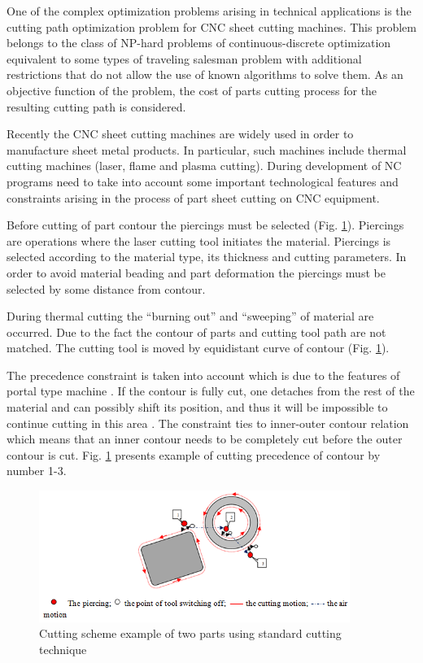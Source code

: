 \documentclass[runningheads]{llncs}
\begin{document}
One of the complex optimization problems arising in technical applications
is the cutting path optimization problem for CNC sheet cutting machines.
This problem belongs to the class of NP-hard problems
of continuous-discrete optimization
equivalent to some types of traveling salesman problem
with additional restrictions
that do not allow the use of known algorithms to solve them.
As an objective function of the problem,
the cost of parts cutting process for the resulting cutting path is considered.

Recently the CNC sheet cutting machines are widely used in order to manufacture sheet metal products.
In particular, such machines include thermal cutting machines
(laser, flame and plasma cutting).
During development of NC programs need to take into account
some important technological features and constraints
arising in the process of part sheet cutting on CNC equipment.

Before cutting of part contour the piercings must be selected (Fig. \ref{elements}).
Piercings are operations where the laser cutting tool initiates the material.
Piercings is selected according to the material type, its thickness and cutting parameters.
In order to avoid material beading and part deformation
the piercings must be selected by some distance from contour.

During thermal cutting the ``burning out'' and ``sweeping'' of material are occurred.
Due to the fact the contour of parts and cutting tool path are not matched.
The cutting tool is moved by equidistant curve of contour (Fig. \ref{elements}).

The precedence constraint is taken into account
which is due to the features of portal type machine \cite{ru01,ru02}.
If the contour is fully cut,
one detaches from the rest of the material
and can possibly shift its position,
and thus it will be impossible to continue cutting in this area \cite{Dewil2015}.
The constraint ties to inner-outer contour relation which means that
an inner contour needs to be completely cut before the outer contour is cut.
Fig. \ref{elements} presents example of cutting precedence of contour by number 1-3.

\begin{figure}
  \begin{center}
  \includegraphics[width=0.9\textwidth]{elements.png}
  \caption{Cutting scheme example of two parts using standard cutting technique}
  \label{elements}
  \end{center}
\end{figure}
\end{document}
